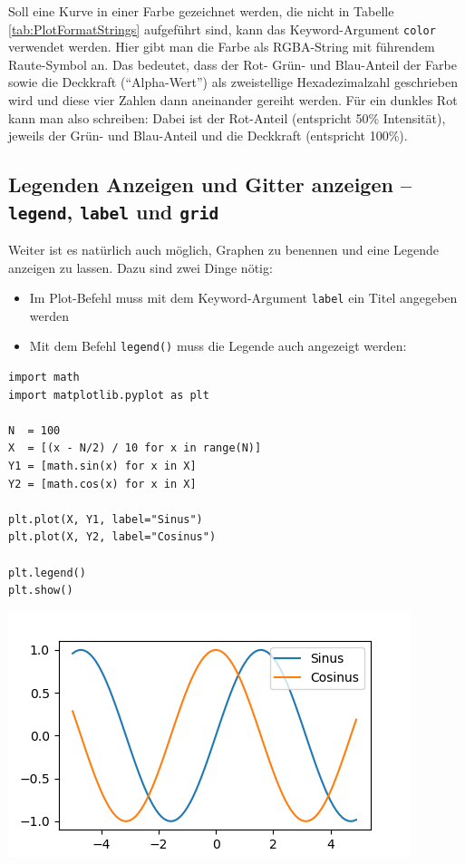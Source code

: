 Soll eine Kurve in einer Farbe gezeichnet werden, die nicht in Tabelle \ref{tab:PlotFormatStrings} aufgeführt sind, kann das Keyword-Argument \texttt{color} verwendet werden. Hier gibt man die Farbe als RGBA-String mit führendem Raute-Symbol an. Das bedeutet, dass der Rot- Grün- und Blau-Anteil der Farbe sowie die Deckkraft (\enquote{Alpha-Wert}) als zweistellige Hexadezimalzahl geschrieben wird und diese vier Zahlen dann aneinander gereiht werden. Für ein dunkles Rot kann man also schreiben:
Dabei ist  der Rot-Anteil (entspricht 50\% Intensität),  jeweils der Grün- und Blau-Anteil und  die Deckkraft (entspricht 100\%).

\subsection{Legenden Anzeigen und Gitter anzeigen -- \texttt{legend}, \texttt{label} und \texttt{grid}}
Weiter ist es natürlich auch möglich, Graphen zu benennen und eine Legende anzeigen zu lassen. Dazu sind zwei Dinge nötig:
\begin{itemize}
\item Im Plot-Befehl muss mit dem Keyword-Argument \texttt{label} ein Titel angegeben werden
\item Mit dem Befehl \texttt{legend()} muss die Legende auch angezeigt werden:
\end{itemize}

\begin{codebox}[Beispiel: Plot mit Legende, width=.55\linewidth, nobeforeafter, equal height group = grpXmpSimplePlotLegend]
\begin{verbatim}
import math
import matplotlib.pyplot as plt

N  = 100
X  = [(x - N/2) / 10 for x in range(N)]
Y1 = [math.sin(x) for x in X]
Y2 = [math.cos(x) for x in X]

plt.plot(X, Y1, label="Sinus")
plt.plot(X, Y2, label="Cosinus")

plt.legend()
plt.show()
\end{verbatim}
\end{codebox}
%
\begin{tcolorbox}[title=Ausgabe: Plot mit Legende, width=.45\linewidth, nobeforeafter, equal height group = grpXmpSimplePlotLegend]
	\includegraphics[width=\linewidth]{./gfx/plt-legend}
\end{tcolorbox}

